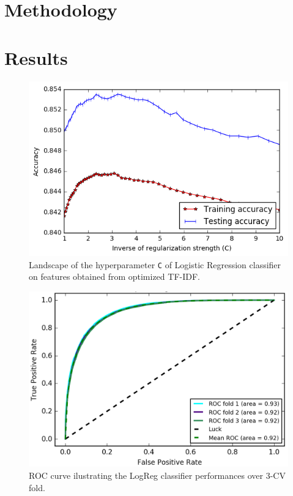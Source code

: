 \documentclass[10pt,conference,compsocconf]{IEEEtran}
\begin{document}
\section{Methodology}

\section{Results}

\begin{figure}[tbp]
  \centering
  \includegraphics[width=\columnwidth]{plots/C_value_vs_accuracy.png}
  \caption{Landscape of the hyperparameter \texttt{C} of Logistic Regression classifier on features obtained from optimized TF-IDF.}
  \vspace{-3mm}
  \label{fig:C_Landscape}
\end{figure}
\begin{figure}[tbp]
  \centering
  \includegraphics[width=\columnwidth]{plots/ROC_logreg.png}
  \caption{ROC curve ilustrating the LogReg classifier performances over 3-CV fold.}
  \vspace{-3mm}
  \label{fig:ROC}
\end{figure}
\iffalse
\end{document}

